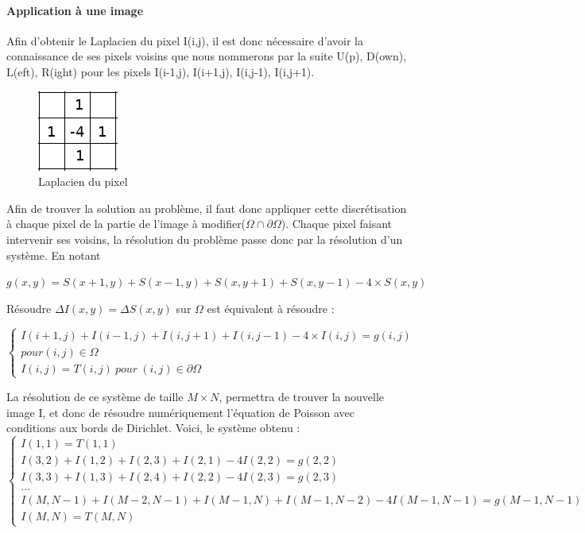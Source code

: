 \paragraph{Application à une image }
Afin d'obtenir le Laplacien du pixel I(i,j), il est donc nécessaire d'avoir la connaissance de ses pixels voisins que nous nommerons par la suite U(p), D(own), L(eft), R(ight) pour les pixels I(i-1,j), I(i+1,j), I(i,j-1), I(i,j+1). 

\begin{figure}
\centering
    \includegraphics[scale = 0.8]{Images/Laplacian.png}
    \caption{Laplacien du pixel}
\end{figure}
Afin de trouver la solution au problème, il faut donc appliquer cette discrétisation à chaque pixel de la partie de l'image à modifier($\Omega \cap \partial \Omega$). Chaque pixel faisant intervenir ses voisins, la résolution du problème passe donc par la résolution d'un système.
En notant
\begin{center}
 $g(x,y) = S(x+1,y) + S(x-1,y)+ S(x,y+1) + S(x,y-1) - 4\times S(x,y)$\\
 \end{center}
Résoudre $\Delta I(x,y) = \Delta S(x,y)$ sur $\Omega$ est équivalent à résoudre :\\
\begin{center}
\begin{equation*}
    \left \{
    \begin{aligned}
    I(i+1,j) + I(i-1,j)+ I(i,j+1) + I(i, j-1) - 4\times 			I(i,j)= g(i,j)\\ pour (i,j)\in \Omega \\
    I(i,j) = T(i,j) \ pour \ (i,j) \in \partial \Omega
    \end{aligned}
    \right.
\end{equation*}
\end{center}
La résolution de ce système de taille $M\times N $, permettra de trouver la nouvelle image I, et donc de résoudre numériquement l'équation de Poisson avec conditions aux bords de Dirichlet. Voici, le système obtenu : 
\begin{equation}
\left\{
\begin{aligned}
I(1,1) = T(1,1)\\
I(3,2)+I(1,2)+ I(2,3)+I(2,1)-4I(2,2) =g(2,2) \\
I(3,3)+I(1,3)+ I(2,4)+I(2,2)-4I(2,3) =g(2,3)             \\
... \\
I(M,N-1)+I(M-2,N-1)+ I(M-1,N)+I(M-1,N-2)-4I(M-1,N-1) =g(M-1,N-1)\\
I(M, N) = T(M, N)
\end{aligned}
\right.
\end{equation}
